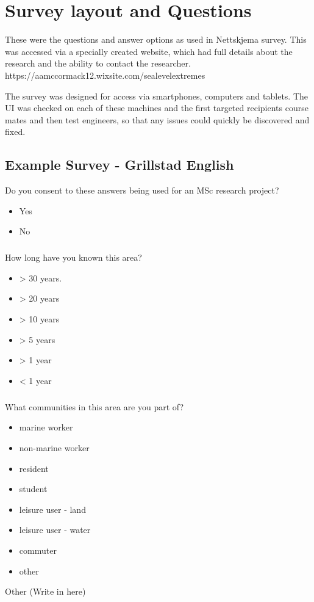 \chapter{Survey layout and Questions}


These were the questions and answer options as used in Nettskjema survey. This was accessed via a specially created website, which had full details about the research and the ability to contact the researcher. 
https://aamccormack12.wixsite.com/sealevelextremes 

The survey was designed for access via smartphones, computers and tablets. The UI was checked on each of these machines and the first targeted recipients course mates and then test engineers, so that any issues could quickly be discovered and fixed. 

\section{Example Survey - Grillstad English}

Do you consent to these answers being used for an MSc research project?
\begin{itemize}
	\item Yes
    \item No
\end{itemize}

\paragraph{}
How long have you known this area?
\begin{itemize}
	\item > 30 years.
    \item > 20 years
    \item > 10 years
    \item > 5 years
    \item > 1 year
    \item < 1 year
\end{itemize}

\paragraph{}
What communities in this area are you part of?
\begin{itemize}
    \item marine worker
    \item non-marine worker
    \item resident
    \item student
    \item leisure user - land
    \item leisure user - water
    \item commuter
    \item other 
\end{itemize}
Other (Write in here)
